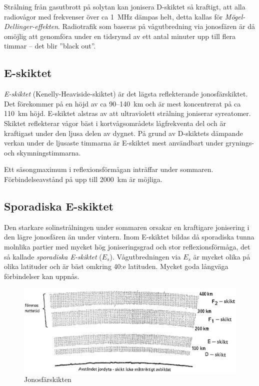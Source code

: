 Strålning från gasutbrott på solytan kan jonisera D-skiktet så
kraftigt, att alla radiovågor med frekvenser över ca 1~MHz dämpas helt,
detta kallas för \emph{Mögel-Dellinger-effekten}.
Radiotrafik som baseras på vågutbredning via jonosfären är då
omöjlig att genomföra under en tidsrymd av ett antal minuter upp till
flera timmar -- det blir ''black out''.

\subsection{E-skiktet}

\emph{E-skiktet} (Kenelly-Heaviside-skiktet) är det lägsta reflekterande
jonosfärskiktet.
Det förekommer på en höjd av ca 90--140~km och är mest koncentrerat på
ca 110~km höjd.
E-skiktet alstras av att ultraviolett strålning joniserar syreatomer.
Skiktet reflekterar vågor bäst i kortvågsområdets lågfrekventa del och är
kraftigast under den ljusa delen av dygnet.
På grund av D-skiktets dämpande verkan under de ljusaste timmarna är E-skiktet
mest användbart under grynings- och skymningstimmarna.

Ett säsongmaximum i reflexionsförmågan inträffar under sommaren.
Förbindelseavstånd på upp till 2000~km är möjliga.

\subsection{Sporadiska E-skiktet}

Den starkare solinstrålningen under sommaren orsakar en kraftigare
jonisering i den lägre jonosfären än under vintern.
Inom E-skiktet bildas då sporadiska tunna molnlika partier med mycket hög
joniseringsgrad och stor reflexionsförmåga, det så kallade \emph{sporadiska
E-skiktet} (\(E_s\)).
Vågutbredningen via \(E_s\) är mycket olika på olika latituder och är bäst
omkring 40:e latituden.
Mycket goda långväga förbindelser kan uppnås.

\begin{figure}
  \includegraphics[width=\textwidth]{images/cropped_pdfs/bild_2_7-07.pdf}
  \caption{Jonosfärskikten}
  \label{fig:bildII7-7}
\end{figure}

